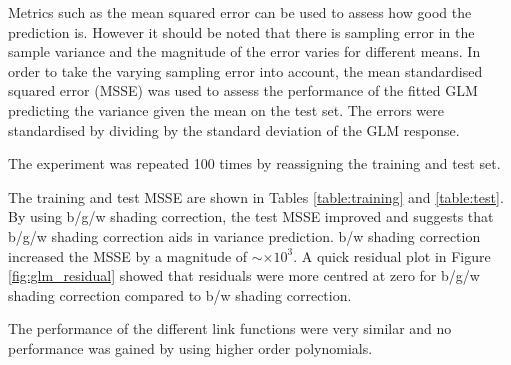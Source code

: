 \documentclass[a4paper]{proc}
\begin{document}
Metrics such as the mean squared error can be used to assess how good the prediction is. However it should be noted that there is sampling error in the sample variance and the magnitude of the error varies for different means. In order to take the varying sampling error into account, the mean standardised squared error (MSSE) was used to assess the performance of the fitted GLM predicting the variance given the mean on the test set. The errors were standardised by dividing by the standard deviation of the GLM response.

The experiment was repeated 100 times by reassigning the training and test set.

The training and test MSSE are shown in Tables \ref{table:training} and \ref{table:test}. By using b/g/w shading correction, the test MSSE improved and suggests that b/g/w shading correction aids in variance prediction. b/w shading correction increased the MSSE by a magnitude of $\sim\times10^3$. A quick residual plot in Figure \ref{fig:glm_residual} showed that residuals were more centred at zero for b/g/w shading correction compared to b/w shading correction. 

The performance of the different link functions were very similar and no performance was gained by using higher order polynomials.


\end{document}
